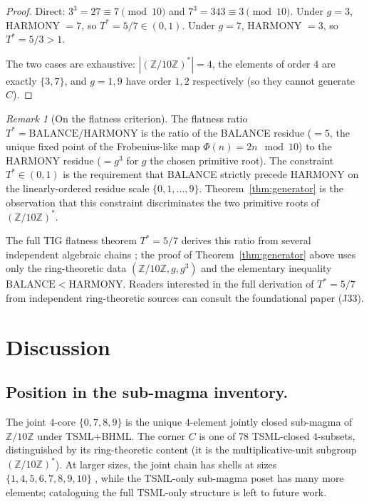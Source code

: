 \documentclass[11pt,reqno]{amsart}
\theoremstyle{plain}
\theoremstyle{definition}
\theoremstyle{remark}
\newtheorem*{remark}{Remark}
\newcommand{\Z}{\mathbb{Z}}
\begin{document}
\begin{proof}
Direct: $3^3 = 27 \equiv 7 \pmod{10}$ and $7^3 = 343 \equiv 3 \pmod
{10}$.  Under $g = 3$, HARMONY $= 7$, so $T^* = 5/7 \in (0, 1)$.
Under $g = 7$, HARMONY $= 3$, so $T^* = 5/3 > 1$.

The two cases are exhaustive: $|(\Z/10\Z)^*| = 4$, the elements of
order $4$ are exactly $\{3, 7\}$, and $g = 1, 9$ have order $1, 2$
respectively (so they cannot generate $C$).
\end{proof}

\begin{remark}[On the flatness criterion]\label{rem:flatness}
The flatness ratio $T^* = \mathrm{BALANCE}/\mathrm{HARMONY}$ is the
ratio of the BALANCE residue ($= 5$, the unique fixed point of the
Frobenius-like map $\Phi(n) = 2n \mod 10$) to the HARMONY residue
($= g^3$ for $g$ the chosen primitive root).  The constraint
$T^* \in (0, 1)$ is the requirement that BALANCE strictly precede
HARMONY on the linearly-ordered residue scale $\{0, 1, \ldots, 9\}$.
Theorem~\ref{thm:generator} is the observation that this constraint
discriminates the two primitive roots of $(\Z/10\Z)^*$.

The full TIG flatness theorem $T^* = 5/7$ derives this ratio from
several independent algebraic chains \cite[D18d]{SandersTIG};
the proof of Theorem~\ref{thm:generator} above uses only the
ring-theoretic data $(\Z/10\Z, g, g^3)$ and the elementary inequality
$\mathrm{BALANCE} < \mathrm{HARMONY}$.  Readers interested in the
full derivation of $T^* = 5/7$ from independent ring-theoretic
sources can consult the foundational paper
\cite[\S 4]{SandersTIG} (J33).
\end{remark}

\section{Discussion}
\label{sec:discussion}

\subsection{Position in the sub-magma inventory.}
The joint $4$-core $\{0, 7, 8, 9\}$ is the unique $4$-element jointly
closed sub-magma of $\Z/10\Z$ under TSML+BHML.  The corner $C$ is one
of $78$ TSML-closed $4$-subsets, distinguished by its ring-theoretic
content (it is the multiplicative-unit subgroup
$(\Z/10\Z)^*$).  At larger sizes, the joint chain has shells at
sizes $\{1, 4, 5, 6, 7, 8, 9, 10\}$
\cite[Theorem 1]{SandersGishFourCore}, while the TSML-only sub-magma
poset has many more elements; cataloguing the full TSML-only structure
is left to future work.
\end{document}
